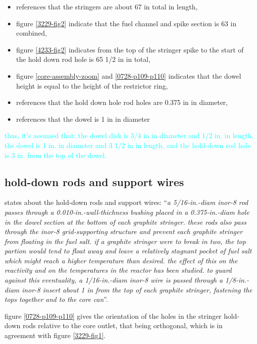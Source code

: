 \documentclass{article}
\begin{document}
\begin{preview}
\begin{itemize}
  \item
  \textcite[page 112 and 114]{ornl-tm-3039} references that the stringers are about 67 in total in length,
  \item
  figure \ref{3229-fig2} indicate that the fuel channel and spike section is 63 in combined,
  \item
  figure \ref{4233-fig2} indicates from the top of the stringer spike to the start of the hold down rod hole is 65 1/2 in in total,
  \item
  figure \ref{core-assembly-zoom} and \ref{0728-p109-p110} indicates that the dowel height is equal to the height of the restrictor ring,
  \item
  \parencite[page 84-85]{ornl-tm-0728} references that the hold down hole rod holes are 0.375 in in diameter,
  \item
  \parencite[page 79 and 81]{ornl-tm-0728} references that the dowel is 1 in in diameter
\end{itemize}
\textcolor{cyan}{thus, it's assumed that: the dowel disk is 3/4 in in diameter and 1/2 in. in length, the dowel is 1 in. in diameter and 3 1/2 in in length, and the hold-down rod hole is 3 in. from the top of the dowel.}

\subsection{hold-down rods and support wires}
\label{sec:hold-down-rods-support-wires}
\parencite[page 84-85]{ornl-tm-0728} states about the hold-down rods and support wires:
\enquote{\textit{a 5/16-in.-diam inor-8 rod passes through a 0.010-in.-wall-thichness bushing placed in a 0.375-in.-diam hole in the dowel section at the bottom of each graphite stringer. these rods also pass through the inor-8 grid-supporting structure and prevent each graphite stringer from floating in the fuel salt. if a graphite stringer were to break in two, the top partion would tend to float away and leave a relatively stagnant pocket of fuel salt which might reach a higher temperature than desired. the effect of this on the reactivity and on the temperatures in the reactor has been studied. to guard against this eventuality, a 1/16-in.-diam inor-8 wire is passed through a 1/8-in.-diam inor-8 insert about 1 in from the top of each graphite stringer, fastening the tops together and to the core can}}.

figure \ref{0728-p109-p110} gives the orientation of the holes in the stringer hold-down rods relative to the core outlet, that being orthogonal, which is in agreement with figure \ref{3229-fig1}.



\end{preview}
\end{document}
